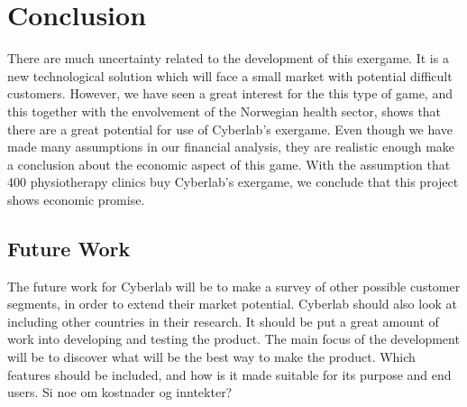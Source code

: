 \chapter{Conclusion}
There are much uncertainty related to the development of this exergame. It is a new technological solution which will face a small market with potential difficult customers. However, we have seen a great interest for the this type of game, and this together with the envolvement of the Norwegian health sector, shows that there are a great potential for use of Cyberlab’s exergame. Even though we have made many assumptions in our financial analysis, they are realistic enough make a conclusion about the economic aspect of this game. With the assumption that 400 physiotherapy clinics buy Cyberlab’s exergame, we conclude that this project shows economic promise.  
\section{Future Work}
The future work for Cyberlab will be to make a survey of other possible customer segments, in order to extend their market potential. Cyberlab should also look at including other countries in their research.
It should be put a great amount of work into developing and testing the product. The main focus of the development will be to discover what will be the best way to make the product. Which features should be included, and how is it made suitable for its purpose and end users.
Si noe om kostnader og inntekter? 
